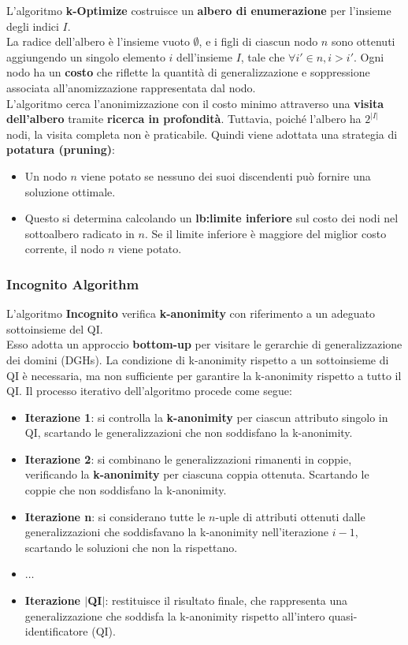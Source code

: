 \documentclass{report}
\begin{document}
\noindent L'algoritmo \textbf{k-Optimize} costruisce un \textbf{albero di enumerazione} per l'insieme degli indici $I$. \\
La radice dell'albero è l'insieme vuoto $\emptyset$, e i figli di ciascun nodo $n$ sono ottenuti aggiungendo un singolo elemento $i$ dell'insieme $I$, tale che $\forall i' \in n, i > i'$. 
Ogni nodo ha un \textbf{costo} che riflette la quantità di generalizzazione e soppressione associata all'anomizzazione rappresentata dal nodo. \\
L'algoritmo cerca l'anonimizzazione con il costo minimo attraverso una \textbf{visita dell'albero} tramite \textbf{ricerca in profondità}. 
Tuttavia, poiché l'albero ha $2^{|I|}$ nodi, la visita completa non è praticabile. Quindi viene adottata una strategia di \textbf{potatura (pruning)}:

\begin{itemize}
    \item Un nodo $n$ viene potato se nessuno dei suoi discendenti può fornire una soluzione ottimale.
    \item Questo si determina calcolando un \textbf{lb:limite inferiore} sul costo dei nodi nel sottoalbero radicato in $n$. 
    Se il limite inferiore è maggiore del miglior costo corrente, il nodo $n$ viene potato.
\end{itemize}

\newpage
\subsubsection{Incognito Algorithm}
L'algoritmo \textbf{Incognito} verifica \textbf{k-anonimity} con riferimento a un adeguato sottoinsieme del QI. \\ 
Esso adotta un approccio \textbf{bottom-up} per visitare le gerarchie di generalizzazione dei domini (DGHs). 
La condizione di k-anonimity rispetto a un sottoinsieme di QI è necessaria, ma non sufficiente per garantire la k-anonimity rispetto a tutto il QI. 
Il processo iterativo dell'algoritmo procede come segue:

\begin{itemize}
    \item \textbf{Iterazione 1}: si controlla la \textbf{k-anonimity} per ciascun attributo singolo in QI, scartando le generalizzazioni che non soddisfano la k-anonimity.
    \item \textbf{Iterazione 2}: si combinano le generalizzazioni rimanenti in coppie, verificando la \textbf{k-anonimity} per ciascuna coppia ottenuta. Scartando le coppie che non soddisfano la k-anonimity.
    \item \textbf{Iterazione n}: si considerano tutte le $n$-uple di attributi ottenuti dalle generalizzazioni che soddisfavano la k-anonimity nell'iterazione $i-1$, scartando le soluzioni che non la rispettano.
    \item $\ldots$
    \item \textbf{Iterazione $|$QI$|$}: restituisce il risultato finale, che rappresenta una generalizzazione che soddisfa la k-anonimity rispetto all'intero quasi-identificatore (QI).
\end{itemize}
\end{document}
